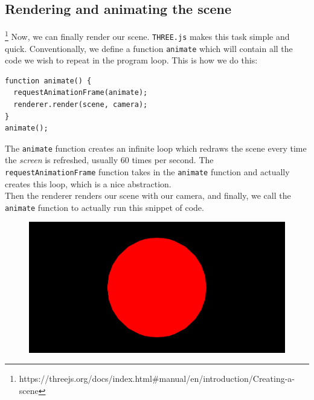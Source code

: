 \newpage
\subsection{Rendering and animating the scene}\footnote{https://threejs.org/docs/index.html\#manual/en/introduction/Creating-a-scene}
Now, we can finally render our scene. \verb|THREE.js| makes this task simple and quick. Conventionally, we define a function \verb|animate| which will contain all the code we wish to repeat in the program loop. This is how we do this:
\begin{lstlisting}
function animate() {
  requestAnimationFrame(animate);
  renderer.render(scene, camera);
}
animate();
\end{lstlisting}
The \verb|animate| function creates an infinite loop which redraws the scene every time the \textit{screen} is refreshed, usually 60 times per second. The \\ \verb|requestAnimationFrame| function takes in the \verb|animate| function and actually creates this loop, which is a nice abstraction. \\
Then the renderer renders our scene with our camera, and finally, we call the \verb|animate| function to actually run this snippet of code.
\begin{figure}[h]
\centering
\includegraphics[width=0.7\linewidth]{images/setup_output2}
\caption{}
\label{fig:setupoutput2}
\end{figure}

